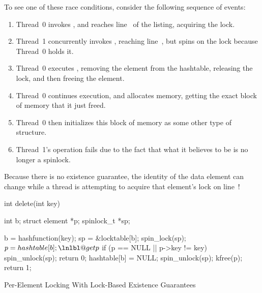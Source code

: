 \begin{fcvref}
To see one of these race conditions, consider the following sequence
of events:
\begin{enumerate}
\item	Thread~0 invokes , and reaches line~ of
	the listing, acquiring the lock.
\item	Thread~1 concurrently invokes , reaching
	line~, but spins on the lock because Thread~0 holds it.
\item	Thread~0 executes , removing the element from
	the hashtable, releasing the lock, and then freeing the
	element.
\item	Thread~0 continues execution, and allocates memory, getting
	the exact block of memory that it just freed.
\item	Thread~0 then initializes this block of memory as some
	other type of structure.
\item	Thread~1's  operation fails due to the
	fact that what it believes to be  is no longer
	a spinlock.
\end{enumerate}
Because there is no existence guarantee, the identity of the
data element can change while a thread is attempting to acquire
that element's lock on line~!
\end{fcvref}

\begin{listing}
\begin{fcvlabel}
\begin{VerbatimL}[commandchars=\\\@\$]
int delete(int key)
{
	int b;
	struct element *p;
	spinlock_t *sp;

	b = hashfunction(key);
	sp = &locktable[b];
	spin_lock(sp);				\lnlbl@acq$
	p = hashtable[b];			\lnlbl@getp$
	if (p == NULL || p->key != key) {
		spin_unlock(sp);
		return 0;
	}
	hashtable[b] = NULL;
	spin_unlock(sp);
	kfree(p);
	return 1;
}
\end{VerbatimL}
\end{fcvlabel}
\caption{Per-Element Locking With Lock-Based Existence Guarantees}
\label{lst:locking:Per-Element Locking With Lock-Based Existence Guarantees}
\end{listing}

